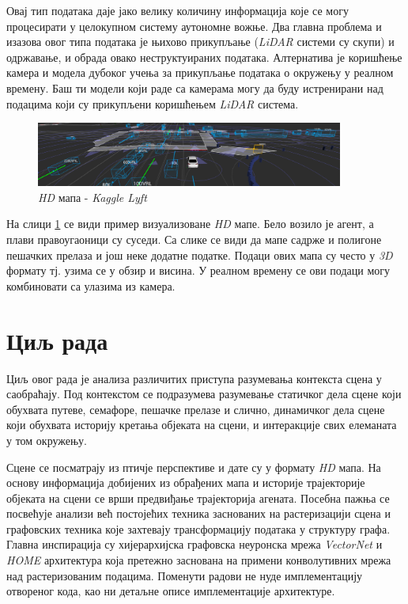 \documentclass[11pt,oneside]{memoir}
\begin{document}
Овај тип података даје јако велику количину информација које се могу процесирати у целокупном систему аутономне вожње. Два главна проблема
и изазова овог типа података је њихово прикупљање (\textit{LiDAR} системи су скупи) и одржавање, и обрада овако неструктуираних података. Алтернатива
је коришћење камера и модела дубоког учења за прикупљање података о окружењу у реалном времену. Баш ти модели који раде са
камерама могу да буду истренирани над подацима који су прикупљени коришћењем \textit{LiDAR} система.

\begin{figure}[H]
  \centering
  \includegraphics[width=0.9\textwidth]{images/lyft-hd-map.png}
  \caption{\textit{HD} мапа - \textit{Kaggle Lyft} \cite{kaggle_lyft} \label{kaggle-lyft-example}}
\end{figure}

На слици \ref{kaggle-lyft-example} се види пример визуализоване \textit{HD} мапе. Бело возило је агент, а плави правоугаоници су суседи. 
Са слике се види да мапе садрже и полигоне пешачких прелаза и још неке додатне податке. Подаци ових мапа су често у \textit{3D} формату
тј. узима се у обзир и висина. У реалном времену се ови подаци могу комбиновати са улазима из камера. 

\section{Циљ рада}

Циљ овог рада је анализа различитих приступа разумевања контекста сцена у саобраћају. 
Под контекстом се подразумева разумевање статичког дела сцене који обухвата путеве,
семафоре, пешачке прелазе и слично, динамичког дела сцене који обухвата историју кретања објеката на сцени, и интеракције 
свих елеманата у том окружењу. 

Сцене се посматрају из птичје перспективе
и дате су у формату \textit{HD} мапа. На основу информација добијених из обрађених мапа и историје трајекторије објеката
на сцени се врши предвиђање трајекторија агената. Посебна пажња се посвећује анализи већ постојећих
техника заснованих на растеризацији сцена и графовских техника које захтевају трансформацију података у структуру графа. 
Главна инспирација су хијерархијска графовска неуронска мрежа \textit{VectorNet} \cite{vectornet} и \textit{HOME} \cite{home}
архитектура која претежно заснована на примени конволутивних мрежа над растеризованим подацима. Поменути радови не нуде
имплементацију отвореног кода, као ни детаљне описе имплементације архитектуре.
\end{document}
